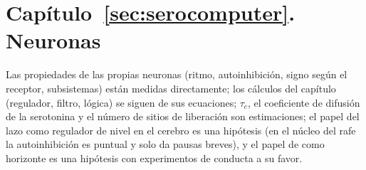 \section{Capítulo~\ref{sec:serocomputer}. Neuronas }

Las propiedades de las propias neuronas  (ritmo, autoinhibición, signo según el receptor, subsistemas) están medidas directamente; los cálculos del capítulo (regulador, filtro, lógica) se siguen de sus ecuaciones; $\tau_c$, el coeficiente de difusión de la serotonina y el número de sitios de liberación son estimaciones; el papel del lazo como regulador de nivel en el cerebro es una hipótesis (en el núcleo del rafe la autoinhibición es puntual y solo da pausas breves), y el papel de  como horizonte es una hipótesis con experimentos de conducta a su favor.

